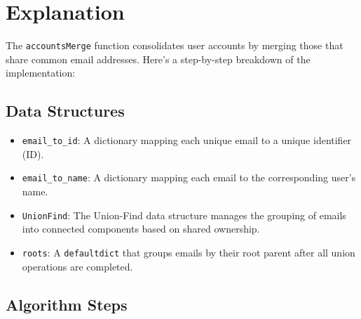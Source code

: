 \section*{Explanation}

The \texttt{accountsMerge} function consolidates user accounts by merging those that share common email addresses. Here's a step-by-step breakdown of the implementation:

\subsection*{Data Structures}

\begin{itemize}
    \item \texttt{email\_to\_id}:  
    A dictionary mapping each unique email to a unique identifier (ID).

    \item \texttt{email\_to\_name}:  
    A dictionary mapping each email to the corresponding user's name.

    \item \texttt{UnionFind}:  
    The Union-Find data structure manages the grouping of emails into connected components based on shared ownership.
    
    \item \texttt{roots}:  
    A \texttt{defaultdict} that groups emails by their root parent after all union operations are completed.
\end{itemize}

\subsection*{Algorithm Steps}

